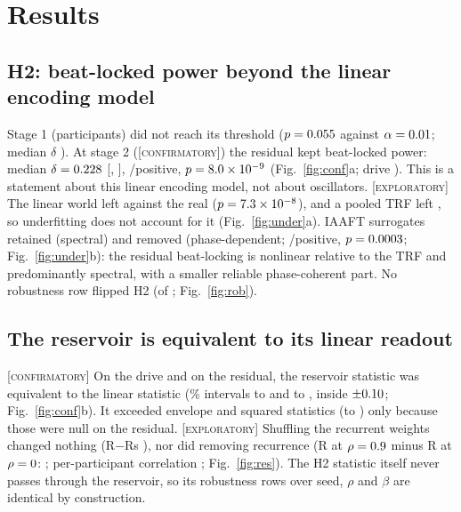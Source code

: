 \documentclass[journal]{IEEEtran}
\newcommand{\Conf}{\textsc{[confirmatory]}\xspace}
\newcommand{\Expl}{\textsc{[exploratory]}\xspace}
\begin{document}
\section{Results}
\subsection{H2: beat-locked power beyond the linear encoding model}
Stage 1 (\NumNOne participants) did not reach its threshold ($p=0.055$ against $\alpha=0.01$; median $\delta$ \NumStageOneDelta). At stage 2 (\Conf) the residual kept beat-locked power: median $\delta=0.228$ [\NumHTwoLo, \NumHTwoHi], \NumHTwoPos/\NumNTwo positive, $p=8.0\times10^{-9}$ (Fig.~\ref{fig:conf}a; drive \NumDriveDelta [\NumDriveLo, \NumDriveHi]). This is a statement about this linear encoding model, not about oscillators. \Expl The linear world left \NumLinWorld against the real \NumHTwoDelta ($p=7.3\times10^{-8}$), and a pooled TRF left \NumPooledDelta, so underfitting does not account for it (Fig.~\ref{fig:under}a). IAAFT surrogates retained \NumSpectral [\NumSpectralLo, \NumSpectralHi] (spectral) and removed \NumPhase [\NumPhaseLo, \NumPhaseHi] (phase-dependent; \NumPhasePos/\NumNTwo positive, $p=0.0003$; Fig.~\ref{fig:under}b): the residual beat-locking is nonlinear relative to the TRF and predominantly spectral, with a smaller reliable phase-coherent part. No robustness row flipped H2 (\NumNFlips of \NumNRows; Fig.~\ref{fig:rob}).

\subsection{The reservoir is equivalent to its linear readout}
\Conf On the drive and on the residual, the reservoir statistic was equivalent to the linear statistic (\NumTostCiPct\% intervals \NumHOneLo to \NumHOneHi and \NumHThreeLo to \NumHThreeHi, inside $\pm0.10$; Fig.~\ref{fig:conf}b). It exceeded envelope and squared statistics (\NumEnvLo to \NumEnvHi) only because those were null on the residual. \Expl Shuffling the recurrent weights changed nothing (R$-$Rs \NumRRs [\NumRRsLo, \NumRRsHi]), nor did removing recurrence (R at $\rho=0.9$ minus R at $\rho=0$: \NumRRhoZero [\NumRRhoZeroLo, \NumRRhoZeroHi]; per-participant correlation \NumRhoCorr; Fig.~\ref{fig:res}). The H2 statistic itself never passes through the reservoir, so its robustness rows over seed, $\rho$ and $\beta$ are identical by construction.
\end{document}
